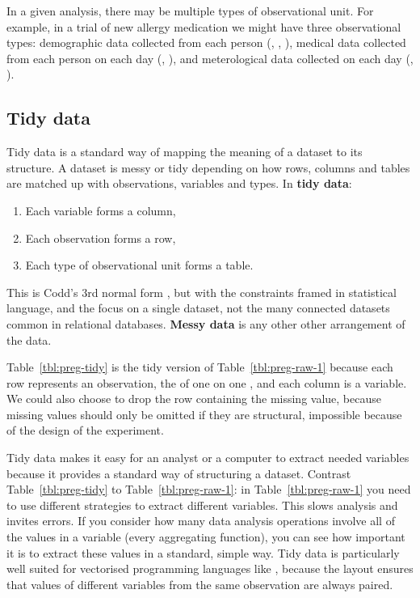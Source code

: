 \documentclass[article]{jss}
\begin{document}
In a given analysis, there may be multiple types of observational unit. For example, in a trial of new allergy medication we might have three observational types: demographic data collected from each person (, , ), medical data collected from each person on each day (, ), and meterological data collected on each day (, ).

\subsection{Tidy data}

Tidy data is a standard way of mapping the meaning of a dataset to its structure. A dataset is messy or tidy depending on how rows, columns and tables are matched up with observations, variables and types. In \textbf{tidy data}:

\begin{enumerate}
  \item Each variable forms a column,
  \item Each observation forms a row,
  \item Each type of observational unit forms a table.
\end{enumerate}

\noindent This is Codd's 3rd normal form \citep{codd:1990}, but with the constraints framed in statistical language, and the focus on a single dataset, not the many connected datasets common in relational databases. \textbf{Messy data} is any other other arrangement of the data. 

Table~\ref{tbl:preg-tidy} is the tidy version of Table~\ref{tbl:preg-raw-1} because each row represents an observation, the  of one  on one , and each column is a variable. We could also choose to drop the row containing the missing value, because missing values should only be omitted if they are structural, impossible because of the design of the experiment.

Tidy data makes it easy for an analyst or a computer to extract needed variables because it provides a standard way of structuring a dataset. Contrast Table~\ref{tbl:preg-tidy} to Table~\ref{tbl:preg-raw-1}: in Table~\ref{tbl:preg-raw-1} you need to use different strategies to extract different variables. This slows analysis and invites errors. If you consider how many data analysis operations involve all of the values in a variable (every aggregating function), you can see how important it is to extract these values in a standard, simple way. Tidy data is particularly well suited for vectorised programming languages like , because the layout ensures that values of different variables from the same observation are always paired.
\end{document}
